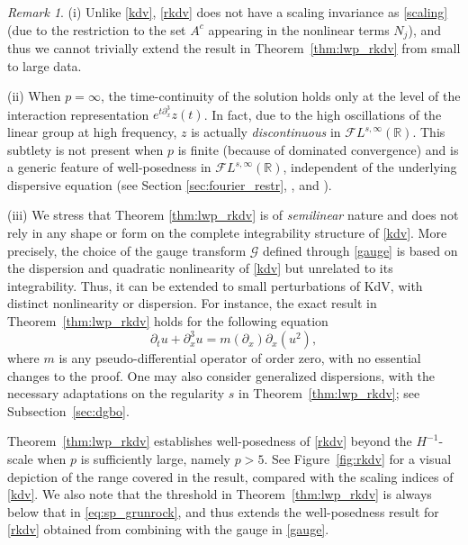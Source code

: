 \documentclass[a4paper,
11pt,  reqno]{amsart}
\newcommand{\5}{\textup{V}}
\newcommand{\noi}{\noindent}
\newcommand{\FL}{\mathcal{F} L}
\newcommand{\dx}{\partial_x}
\theoremstyle{remark}
\newtheorem{remark}[theorem]{Remark}
\newcommand{\R}{\mathbb{R}}
\newcommand{\Gc}{\mathcal{G}}
\numberwithin{equation}{section}
\numberwithin{theorem}{section}
\begin{document}
\begin{remark}
\noi(i)
Unlike \eqref{kdv}, \eqref{rkdv} does not have a scaling invariance as \eqref{scaling} (due to the restriction to the set $A^c$ appearing in the nonlinear terms $N_j$), and thus we cannot trivially extend the result in Theorem~\ref{thm:lwp_rkdv} from small to large data. 


\smallskip 

\label{remark:Linfty_continuity}
\noi (ii) When $p=\infty$, the time-continuity of the solution holds only at the level of the interaction representation $e^{t\dx^3}z(t)$. In fact, due to the high oscillations of the linear group at high frequency, $z$ is actually \emph{discontinuous} in $\FL^{s,\infty}(\R)$. This subtlety is not present when $p$ is finite (because of dominated convergence) and is a generic feature of well-posedness in $\FL^{s,\infty}(\R)$, independent of the underlying dispersive equation (see Section \ref{sec:fourier_restr}, \cite[Section 7]{CC24}, and \cite[Remark~1.4.6]{Forlano}).


\smallskip 

\noi(iii)
We stress that Theorem \ref{thm:lwp_rkdv} is of \emph{semilinear} nature and does not rely in any shape or form on the complete integrability structure of \eqref{kdv}. 
		More precisely, the choice of the gauge transform $\Gc$ defined through \eqref{gauge} is based on the dispersion and quadratic nonlinearity of \eqref{kdv} but unrelated to its integrability. Thus, it can be extended to small perturbations of KdV, with distinct nonlinearity or dispersion. For instance, the exact result in Theorem~\ref{thm:lwp_rkdv} holds for the following equation
		\begin{equation}
			\partial_t u + \partial_x^3 u = m(\partial_x)\partial_x(u^2),
		\end{equation}
		where $m$ is any pseudo-differential operator of order zero, 
        with no essential changes to the proof.
 One may also consider generalized dispersions, with the necessary adaptations on the regularity $s$ in Theorem~\ref{thm:lwp_rkdv}; see Subsection~\ref{sec:dgbo}.


\end{remark}
 
Theorem~\ref{thm:lwp_rkdv} establishes well-posedness of \eqref{rkdv} beyond the $H^{-1}$-scale when $p$ is sufficiently large, namely $p>{5}$. See Figure~\ref{fig:rkdv} for a visual depiction of the range covered in the result, compared with the scaling indices of \eqref{kdv}. 
We also note that the threshold in Theorem~\ref{thm:lwp_rkdv} is always below that in \eqref{eq:sp_grunrock}, and thus extends the well-posedness result for \eqref{rkdv} obtained from combining \cite{Grunrock_ldv_hier} with the gauge in \eqref{gauge}. 
\end{document}
